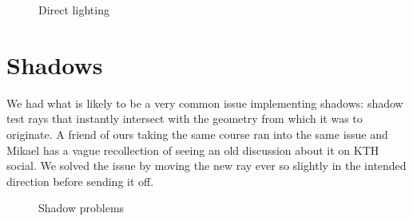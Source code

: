 \documentclass[a4paper,11pt]{article}
\begin{document}
\begin{figure}[H]
    \centering
    \qquad
    \caption{Direct lighting}
\end{figure}

\section*{Shadows}
We had what is likely to be a very common issue implementing shadows: shadow test rays
that instantly intersect with the geometry from which it was to originate. A friend of
ours taking the same course ran into the same issue and Mikael has a vague recollection
of seeing an old discussion about it on KTH social. We solved the issue by moving the 
new ray ever so slightly in the intended direction before sending it off.

\begin{figure}[H]
    \centering
    \qquad
    \caption{Shadow problems}
\end{figure}
\end{document}
